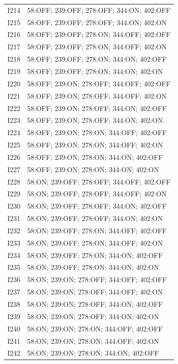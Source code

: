 {\begin{longtable}{lp{.85\linewidth}}
I214 & 58:OFF; 239:OFF; 278:OFF; 344:ON; 402:OFF \\
I215 & 58:OFF; 239:OFF; 278:OFF; 344:ON; 402:ON \\
I216 & 58:OFF; 239:OFF; 278:ON; 344:OFF; 402:OFF \\
I217 & 58:OFF; 239:OFF; 278:ON; 344:OFF; 402:ON \\
I218 & 58:OFF; 239:OFF; 278:ON; 344:ON; 402:OFF \\
I219 & 58:OFF; 239:OFF; 278:ON; 344:ON; 402:ON \\
I220 & 58:OFF; 239:ON; 278:OFF; 344:OFF; 402:OFF \\
I221 & 58:OFF; 239:ON; 278:OFF; 344:OFF; 402:ON \\
I222 & 58:OFF; 239:ON; 278:OFF; 344:ON; 402:OFF \\
I223 & 58:OFF; 239:ON; 278:OFF; 344:ON; 402:ON \\
I224 & 58:OFF; 239:ON; 278:ON; 344:OFF; 402:OFF \\
I225 & 58:OFF; 239:ON; 278:ON; 344:OFF; 402:ON \\
I226 & 58:OFF; 239:ON; 278:ON; 344:ON; 402:OFF \\
I227 & 58:OFF; 239:ON; 278:ON; 344:ON; 402:ON \\
I228 & 58:ON; 239:OFF; 278:OFF; 344:OFF; 402:OFF \\
I229 & 58:ON; 239:OFF; 278:OFF; 344:OFF; 402:ON \\
I230 & 58:ON; 239:OFF; 278:OFF; 344:ON; 402:OFF \\
I231 & 58:ON; 239:OFF; 278:OFF; 344:ON; 402:ON \\
I232 & 58:ON; 239:OFF; 278:ON; 344:OFF; 402:OFF \\
I233 & 58:ON; 239:OFF; 278:ON; 344:OFF; 402:ON \\
I234 & 58:ON; 239:OFF; 278:ON; 344:ON; 402:OFF \\
I235 & 58:ON; 239:OFF; 278:ON; 344:ON; 402:ON \\
I236 & 58:ON; 239:ON; 278:OFF; 344:OFF; 402:OFF \\
I237 & 58:ON; 239:ON; 278:OFF; 344:OFF; 402:ON \\
I238 & 58:ON; 239:ON; 278:OFF; 344:ON; 402:OFF \\
I239 & 58:ON; 239:ON; 278:OFF; 344:ON; 402:ON \\
I240 & 58:ON; 239:ON; 278:ON; 344:OFF; 402:OFF \\
I241 & 58:ON; 239:ON; 278:ON; 344:OFF; 402:ON \\
I242 & 58:ON; 239:ON; 278:ON; 344:ON; 402:OFF \\

\end{longtable}}
